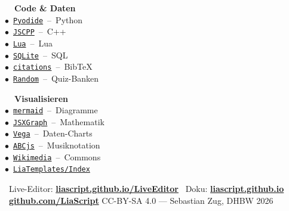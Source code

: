 \documentclass[a4paper,landscape,9pt]{extarticle}
\begin{document}
\begin{minipage}[t]{0.495\linewidth}
\begin{tcolorbox}[infobase, colframe=liagreen!75, colbacktitle=liagreen,
  equal height group=editzeile,
  title={\faPuzzlePiece~~LiaScript-Templates \textnormal{\scriptsize(per \texttt{import:} im Header; alle: \texttt{github.com/LiaTemplates})}}]
\scriptsize
\begin{minipage}[t]{0.48\linewidth}
\textbf{\color{liagreen}\faTerminal~~Code \& Daten}\\[1pt]
$\bullet$~\href{https://github.com/LiaTemplates/Pyodide}{\texttt{Pyodide}}~–~Python\\
$\bullet$~\href{https://github.com/LiaTemplates/JSCPP}{\texttt{JSCPP}}~–~C++\\
$\bullet$~\href{https://github.com/LiaTemplates/Lua}{\texttt{Lua}}~–~Lua\\
$\bullet$~\href{https://github.com/LiaTemplates/SQLite}{\texttt{SQLite}}~–~SQL\\
$\bullet$~\href{https://github.com/LiaTemplates/citations}{\texttt{citations}}~–~BibTeX\\
$\bullet$~\href{https://github.com/LiaTemplates/Random}{\texttt{Random}}~–~Quiz-Banken
\end{minipage}\hfill
\begin{minipage}[t]{0.48\linewidth}
\textbf{\color{liagreen}\faChartBar~~Visualisieren}\\[1pt]
$\bullet$~\href{https://github.com/LiaTemplates/mermaid_template}{\texttt{mermaid}}~–~Diagramme\\
$\bullet$~\href{https://github.com/LiaTemplates/JSXGraph}{\texttt{JSXGraph}}~–~Mathematik\\
$\bullet$~\href{https://github.com/LiaTemplates/Vega}{\texttt{Vega}}~–~Daten-Charts\\
$\bullet$~\href{https://github.com/LiaTemplates/ABCjs}{\texttt{ABCjs}}~–~Musiknotation\\
$\bullet$~\href{https://github.com/LiaTemplates/Wikimedia}{\texttt{Wikimedia}}~–~Commons\\
$\bullet$~\href{https://github.com/LiaTemplates/Index}{\texttt{LiaTemplates/Index}}
\end{minipage}
\end{tcolorbox}
\end{minipage}

\vspace{4pt}
{\sffamily\scriptsize\color{muted}
\faInfoCircle~Live-Editor: \href{https://liascript.github.io/LiveEditor/}{\textbf{liascript.github.io/LiveEditor}}\hfill
\faBook~Doku: \href{https://liascript.github.io}{\textbf{liascript.github.io}}\hfill
\faGithub~\href{https://github.com/LiaScript}{\textbf{github.com/LiaScript}} \quad
CC-BY-SA 4.0 — Sebastian Zug, DHBW 2026}
\end{document}
